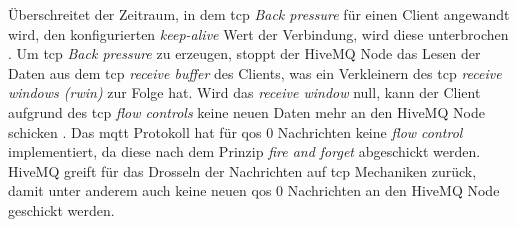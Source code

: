 Überschreitet der Zeitraum, in dem \ac{tcp} \textit{Back pressure} für einen Client angewandt wird, den konfigurierten \textit{keep-alive} Wert der Verbindung, wird diese unterbrochen \cite{ClusterOverloadProtection}.
Um \ac{tcp} \textit{Back pressure} zu erzeugen, stoppt der HiveMQ Node das Lesen der Daten aus dem \ac{tcp} \textit{receive buffer} des Clients, was ein Verkleinern des \ac{tcp} \textit{receive windows (rwin)} zur Folge hat. Wird das \textit{receive window} null, kann der Client aufgrund des \ac{tcp} \textit{flow controls} keine neuen Daten mehr an den HiveMQ Node schicken \cite{TCPFlowControl}.
Das \ac{mqtt} Protokoll hat für \ac{qos} 0 Nachrichten keine \textit{flow control} implementiert, da diese nach dem Prinzip \textit{fire and forget} abgeschickt werden.
HiveMQ greift für das Drosseln der Nachrichten auf \ac{tcp} Mechaniken zurück, damit unter anderem auch keine neuen \ac{qos} 0 Nachrichten an den HiveMQ Node geschickt werden.

